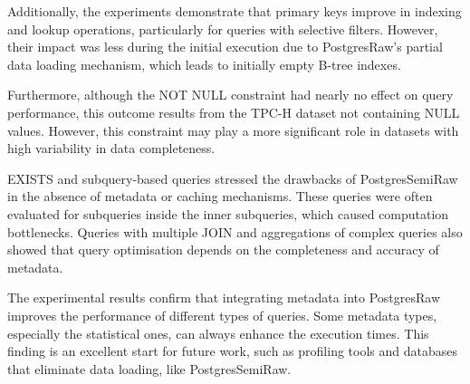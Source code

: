 Additionally, the experiments demonstrate that primary keys improve in indexing and lookup operations, particularly for queries with selective filters. However, their impact was less during the initial execution due to PostgresRaw's partial data loading mechanism, which leads to initially empty B-tree indexes.

Furthermore, although the NOT NULL constraint had nearly no effect on query performance, this outcome results from the TPC-H dataset not containing NULL values. However, this constraint may play a more 
 significant role in datasets with high variability in data completeness.

EXISTS and subquery-based queries stressed the drawbacks of PostgresSemiRaw in the absence of metadata or caching mechanisms. These queries were often evaluated for subqueries inside the inner subqueries, which caused computation bottlenecks. Queries with multiple JOIN and aggregations of complex queries also showed that query optimisation depends on the completeness and accuracy of metadata.

The experimental results confirm that integrating metadata into PostgresRaw improves the
performance of different types of queries. Some metadata types, especially the statistical ones, can always enhance the execution times. This finding is an excellent start for future work, such as profiling tools and databases that eliminate data loading, like PostgresSemiRaw.


